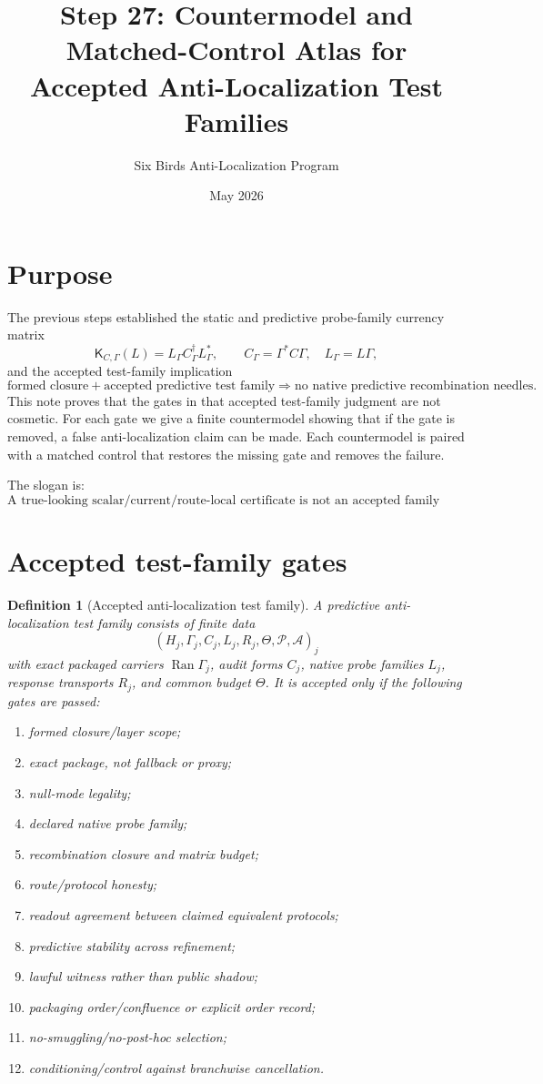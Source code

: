 \documentclass[11pt]{article}
\title{Step 27: Countermodel and Matched-Control Atlas for Accepted Anti-Localization Test Families}
\author{Six Birds Anti-Localization Program}
\date{May 2026}
\newtheorem{definition}{Definition}
\newcommand{\Ran}{\operatorname{Ran}}
\newcommand{\Kmat}{\mathsf K}
\begin{document}
\maketitle

\section{Purpose}
The previous steps established the static and predictive probe-family currency matrix
\[
  \Kmat_{C,\Gamma}(L)=L_\Gamma C_\Gamma^\dagger L_\Gamma^*,
  \qquad C_\Gamma=\Gamma^*C\Gamma,\quad L_\Gamma=L\Gamma,
\]
and the accepted test-family implication
\[
  \text{formed closure} + \text{accepted predictive test family}
  \Longrightarrow
  \text{no native predictive recombination needles}.
\]
This note proves that the gates in that accepted test-family judgment are not cosmetic.  For each gate we give a finite countermodel showing that if the gate is removed, a false anti-localization claim can be made.  Each countermodel is paired with a matched control that restores the missing gate and removes the failure.

The slogan is:
\[
\boxed{\text{A true-looking scalar/current/route-local certificate is not an accepted family membrane.}}
\]

\section{Accepted test-family gates}
\begin{definition}[Accepted anti-localization test family]
A predictive anti-localization test family consists of finite data
\[
  (H_j,\Gamma_j,C_j,L_j,R_j,\Theta,\mathcal P,\mathcal A)_j
\]
with exact packaged carriers \(\Ran\Gamma_j\), audit forms \(C_j\), native probe families \(L_j\), response transports \(R_j\), and common budget \(\Theta\).  It is accepted only if the following gates are passed:
\begin{enumerate}[label=G\arabic*.,leftmargin=2.2em]
\item formed closure/layer scope;
\item exact package, not fallback or proxy;
\item null-mode legality;
\item declared native probe family;
\item recombination closure and matrix budget;
\item route/protocol honesty;
\item readout agreement between claimed equivalent protocols;
\item predictive stability across refinement;
\item lawful witness rather than public shadow;
\item packaging order/confluence or explicit order record;
\item no-smuggling/no-post-hoc selection;
\item conditioning/control against branchwise cancellation.
\end{enumerate}
\end{definition}
\end{document}
